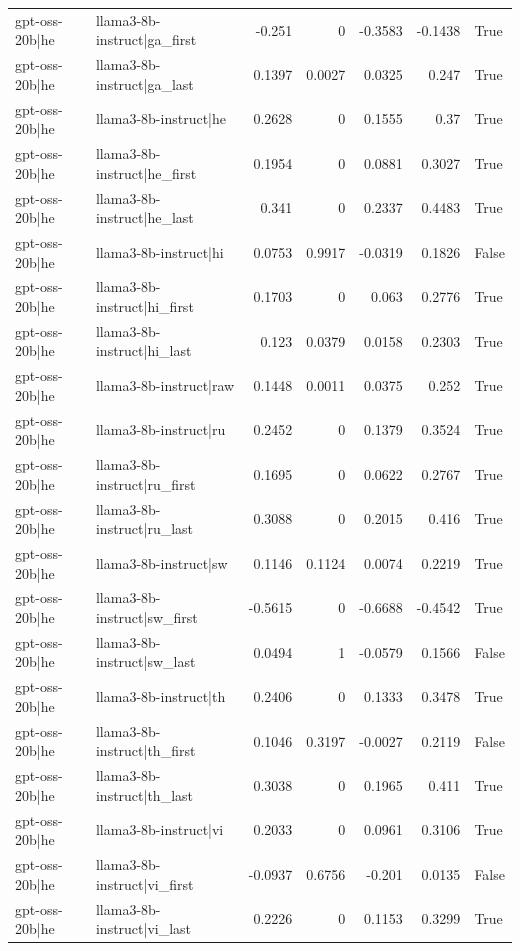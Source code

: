 \begin{table}
\begin{tabular}{l l r r r r l}
gpt-oss-20b|he & llama3-8b-instruct|ga_first & -0.251 & 0 & -0.3583 & -0.1438 & True \\
gpt-oss-20b|he & llama3-8b-instruct|ga_last & 0.1397 & 0.0027 & 0.0325 & 0.247 & True \\
gpt-oss-20b|he & llama3-8b-instruct|he & 0.2628 & 0 & 0.1555 & 0.37 & True \\
gpt-oss-20b|he & llama3-8b-instruct|he_first & 0.1954 & 0 & 0.0881 & 0.3027 & True \\
gpt-oss-20b|he & llama3-8b-instruct|he_last & 0.341 & 0 & 0.2337 & 0.4483 & True \\
gpt-oss-20b|he & llama3-8b-instruct|hi & 0.0753 & 0.9917 & -0.0319 & 0.1826 & False \\
gpt-oss-20b|he & llama3-8b-instruct|hi_first & 0.1703 & 0 & 0.063 & 0.2776 & True \\
gpt-oss-20b|he & llama3-8b-instruct|hi_last & 0.123 & 0.0379 & 0.0158 & 0.2303 & True \\
gpt-oss-20b|he & llama3-8b-instruct|raw & 0.1448 & 0.0011 & 0.0375 & 0.252 & True \\
gpt-oss-20b|he & llama3-8b-instruct|ru & 0.2452 & 0 & 0.1379 & 0.3524 & True \\
gpt-oss-20b|he & llama3-8b-instruct|ru_first & 0.1695 & 0 & 0.0622 & 0.2767 & True \\
gpt-oss-20b|he & llama3-8b-instruct|ru_last & 0.3088 & 0 & 0.2015 & 0.416 & True \\
gpt-oss-20b|he & llama3-8b-instruct|sw & 0.1146 & 0.1124 & 0.0074 & 0.2219 & True \\
gpt-oss-20b|he & llama3-8b-instruct|sw_first & -0.5615 & 0 & -0.6688 & -0.4542 & True \\
gpt-oss-20b|he & llama3-8b-instruct|sw_last & 0.0494 & 1 & -0.0579 & 0.1566 & False \\
gpt-oss-20b|he & llama3-8b-instruct|th & 0.2406 & 0 & 0.1333 & 0.3478 & True \\
gpt-oss-20b|he & llama3-8b-instruct|th_first & 0.1046 & 0.3197 & -0.0027 & 0.2119 & False \\
gpt-oss-20b|he & llama3-8b-instruct|th_last & 0.3038 & 0 & 0.1965 & 0.411 & True \\
gpt-oss-20b|he & llama3-8b-instruct|vi & 0.2033 & 0 & 0.0961 & 0.3106 & True \\
gpt-oss-20b|he & llama3-8b-instruct|vi_first & -0.0937 & 0.6756 & -0.201 & 0.0135 & False \\
gpt-oss-20b|he & llama3-8b-instruct|vi_last & 0.2226 & 0 & 0.1153 & 0.3299 & True \\

\end{tabular}
\end{table}
